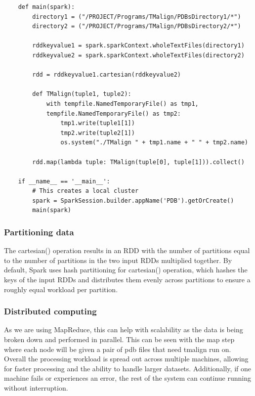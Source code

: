 \documentclass[]{final_report}
\begin{document}
\begin{lstlisting}
    def main(spark):
        directory1 = ("/PROJECT/Programs/TMalign/PDBsDirectory1/*")
        directory2 = ("/PROJECT/Programs/TMalign/PDBsDirectory2/*")

        rddkeyvalue1 = spark.sparkContext.wholeTextFiles(directory1)
        rddkeyvalue2 = spark.sparkContext.wholeTextFiles(directory2)

        rdd = rddkeyvalue1.cartesian(rddkeyvalue2)

        def TMalign(tuple1, tuple2):
            with tempfile.NamedTemporaryFile() as tmp1, 
            tempfile.NamedTemporaryFile() as tmp2:
                tmp1.write(tuple1[1])
                tmp2.write(tuple2[1])
                os.system("./TMalign " + tmp1.name + " " + tmp2.name)

        rdd.map(lambda tuple: TMalign(tuple[0], tuple[1])).collect()
            
    if __name__ == '__main__':
        # This creates a local cluster
        spark = SparkSession.builder.appName('PDB').getOrCreate()
        main(spark)
\end{lstlisting}

\clearpage

\subsubsection{Partitioning data}
The cartesian() operation results in an RDD with the number of partitions equal to the number of partitions in the two input RDDs multiplied together. By default, Spark uses hash partitioning for cartesian() operation, which hashes the keys of the input RDDs and distributes them evenly across partitions to ensure a roughly equal workload per partition.

\subsubsection{Distributed computing}
As we are using MapReduce, this can help with scalability as the data is being broken down and performed in parallel. This can be seen with the map step where each node will be given a pair of pdb files that need tmalign run on. Overall the processing workload is spread out across multiple machines, allowing for faster processing and the ability to handle larger datasets. Additionally, if one machine fails or experiences an error, the rest of the system can continue running without interruption.
\end{document}
